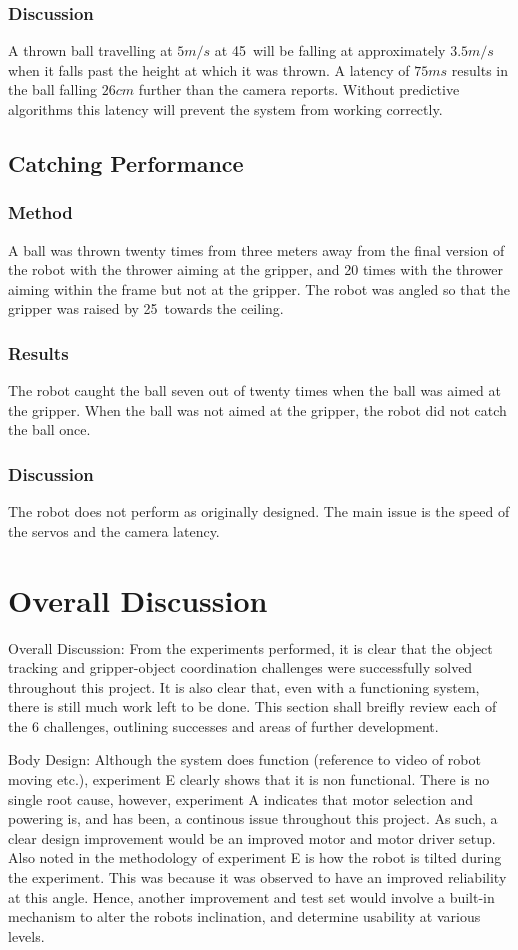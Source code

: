 \documentclass[conference]{IEEEtran}
\begin{document}
		\subsubsection{Discussion}A thrown ball travelling at $5m/s$ at 45\degree\ will be falling at approximately $3.5m/s$ when it falls past the height at which it was thrown.  A latency of $75ms$ results in the ball falling $26cm$ further than the camera reports. Without predictive algorithms this latency will prevent the system from working correctly.
		

	\subsection{Catching Performance}
	\subsubsection{Method}
	A ball was thrown twenty times from three meters away from the final version of the robot with the thrower aiming at the gripper, and 20 times with the thrower aiming within the frame but not at the gripper. The robot was angled so that the gripper was raised by 25\degree\ towards the ceiling. 
	\subsubsection{Results}
	The robot caught the ball seven out of twenty times when the ball was aimed at the gripper. When the ball was not aimed at the gripper, the robot did not catch the ball once.
	\subsubsection{Discussion}
	The robot does not perform as originally designed. The main issue is the speed of the servos and the camera latency.
	

	\section{Overall Discussion}\label{overall}
Overall Discussion:
From the experiments performed, it is clear that the object tracking and gripper-object coordination challenges were successfully solved throughout this project. It is also clear that, even with a functioning system, there is still much work left to be done. This section shall breifly review each of the 6 challenges, outlining successes and areas of further development.

Body Design:
Although the system does function (reference to video of robot moving etc.), experiment E clearly shows that it is non functional. There is no single root cause, however, experiment A indicates that motor selection and powering is, and has been, a continous issue throughout this project. As such, a clear design improvement would be an improved motor and motor driver setup.
Also noted in the methodology of experiment E is how the robot is tilted during the experiment. This was because it was observed to have an improved reliability at this angle. Hence, another improvement and test set would involve a built-in mechanism to alter the robots inclination, and determine usability at various levels.
\end{document}
